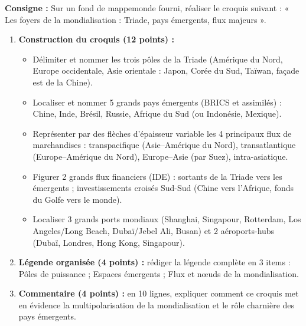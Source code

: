 \documentclass[11pt]{article}
\begin{document}
\begin{exercice}
\textbf{Consigne :} Sur un fond de mappemonde fourni, réaliser le croquis suivant : « Les foyers de la mondialisation : Triade, pays émergents, flux majeurs ».
\begin{enumerate}
\item \textbf{Construction du croquis (12 points) :}
\begin{itemize}
\item Délimiter et nommer les trois pôles de la Triade (Amérique du Nord, Europe occidentale, Asie orientale : Japon, Corée du Sud, Taïwan, façade est de la Chine).
\item Localiser et nommer 5 grands pays émergents (BRICS et assimilés) : Chine, Inde, Brésil, Russie, Afrique du Sud (ou Indonésie, Mexique).
\item Représenter par des flèches d'épaisseur variable les 4 principaux flux de marchandises : transpacifique (Asie--Amérique du Nord), transatlantique (Europe--Amérique du Nord), Europe--Asie (par Suez), intra-asiatique.
\item Figurer 2 grands flux financiers (IDE) : sortants de la Triade vers les émergents ; investissements croisés Sud-Sud (Chine vers l'Afrique, fonds du Golfe vers le monde).
\item Localiser 3 grands ports mondiaux (Shanghai, Singapour, Rotterdam, Los Angeles/Long Beach, Dubaï/Jebel Ali, Busan) et 2 aéroports-hubs (Dubaï, Londres, Hong Kong, Singapour).
\end{itemize}
\item \textbf{Légende organisée (4 points) :} rédiger la légende complète en 3 items : Pôles de puissance ; Espaces émergents ; Flux et nœuds de la mondialisation.
\item \textbf{Commentaire (4 points) :} en 10 lignes, expliquer comment ce croquis met en évidence la multipolarisation de la mondialisation et le rôle charnière des pays émergents.
\end{enumerate}
\end{exercice}
\end{document}
